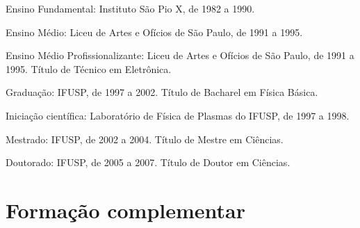 \begin{compactdesc}
	\item[Ensino Fundamental:] Instituto São Pio X, de 1982 a 1990.
	\item[Ensino Médio:] Liceu de Artes e Ofícios de São Paulo, de 1991 a 1995.
	\item[Ensino Médio Profissionalizante:] Liceu de Artes e Ofícios de São Paulo, de 1991 a 1995. Título de Técnico em Eletrônica.
	\item[Graduação:] IFUSP, de 1997 a 2002. Título de Bacharel em Física Básica.
	\item[Iniciação científica:] Laboratório de Física de Plasmas do IFUSP, de 1997 a 1998.
	\item[Mestrado:] IFUSP, de 2002 a 2004. Título de Mestre em Ciências.
	\item[Doutorado:] IFUSP, de 2005 a 2007. Título de Doutor em Ciências.
\end{compactdesc}

\section*{Formação complementar}

